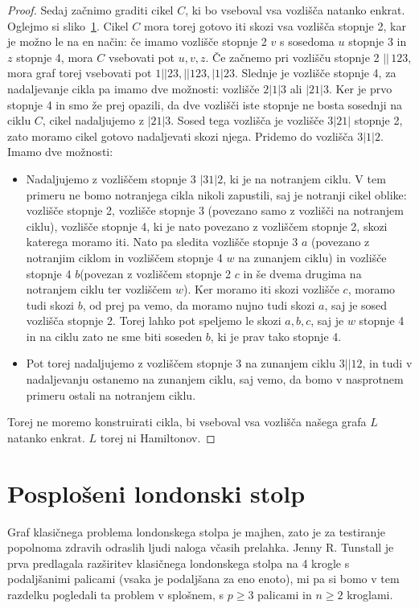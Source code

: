 \documentclass[12pt,a4paper]{amsart}
\theoremstyle{definition} %
\theoremstyle{plain} %
\begin{document}
\begin{proof}
    Sedaj začnimo graditi cikel $C$, ki bo vseboval vsa vozlišča natanko enkrat. Oglejmo si sliko~\ref{}.
    Cikel $C$ mora torej gotovo iti skozi vsa vozlišča stopnje 2, kar je možno le na en način: če imamo vozlišče stopnje 2 $v$ s sosedoma $u$ stopnje 3 in $z$ stopnje 4, mora $C$ vsebovati pot $u,v,z$.
    Če začnemo pri vozlišču stopnje 2 $||\,123$, mora graf torej vsebovati pot $1||23, ||123, |1|23$. Slednje je vozlišče stopnje 4, za nadaljevanje cikla pa imamo dve možnosti: vozlišče $2|1|3$ ali $|21|3$. Ker je prvo stopnje 4 in smo že prej opazili, da dve vozlišči iste stopnje ne bosta sosednji na ciklu $C$, cikel nadaljujemo z $|21|3$. Sosed tega vozlišča je vozlišče $3|21|$ stopnje 2, zato moramo cikel gotovo nadaljevati skozi njega. Pridemo do vozlišča $3|1|2$. Imamo dve možnosti: 
    \begin{itemize}[label={-}]
        \item Nadaljujemo z vozliščem stopnje 3 $|31|2$, ki je na notranjem ciklu. V tem primeru ne bomo notranjega cikla nikoli zapustili, saj je notranji cikel oblike: vozlišče stopnje 2, vozlišče stopnje 3 (povezano samo z vozlišči na notranjem ciklu), vozlišče stopnje 4, ki je nato povezano z vozliščem stopnje 2, skozi katerega moramo iti. Nato pa sledita vozlišče stopnje 3 $a$ (povezano z notranjim ciklom in vozliščem stopnje 4 $w$ na zunanjem ciklu) in vozlišče stopnje 4 $b$(povezan z vozliščem stopnje 2 $c$ in še dvema drugima na notranjem ciklu ter vozliščem $w$). Ker moramo iti skozi vozlišče $c$, moramo tudi skozi $b$, od prej pa vemo, da moramo nujno tudi skozi $a$, saj je sosed vozlišča stopnje 2. Torej lahko pot speljemo le skozi $a,b,c$, saj je $w$ stopnje 4 in na ciklu zato ne sme biti soseden $b$, ki je prav tako stopnje 4.
        \item Pot torej nadaljujemo z vozliščem stopnje 3 na zunanjem ciklu $3||12$, in tudi v nadaljevanju ostanemo na zunanjem ciklu, saj vemo, da bomo v nasprotnem primeru ostali na notranjem ciklu.
    \end{itemize}
    Torej ne moremo konstruirati cikla, bi vseboval vsa vozlišča našega grafa $L$ natanko enkrat. $L$ torej ni Hamiltonov.
    \qedhere
\end{proof}

\section{Posplošeni londonski stolp}
Graf klasičnega problema londonskega stolpa je majhen, zato je za testiranje popolnoma zdravih odraslih ljudi naloga včasih prelahka. Jenny R. Tunstall je prva
predlagala razširitev klasičnega londonskega stolpa na 4 krogle s podaljšanimi palicami (vsaka je podaljšana
za eno enoto), mi pa si bomo v tem razdelku pogledali ta problem v splošnem, s $p \geq 3$ palicami in $n \geq 2$ kroglami.
\end{document}
